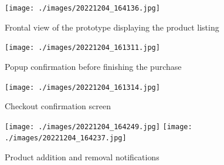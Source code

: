 \documentclass[openright]{normas-utf-tex} %
\begin{document}
\begin{figure}[H]
	\centering
    \texttt{[image: ./images/20221204\_164136.jpg]}
	\caption[]{Frontal view of the prototype displaying the product listing}
\end{figure}

\begin{figure}[H]
	\centering
    \texttt{[image: ./images/20221204\_161311.jpg]}
    \caption[]{Popup confirmation before finishing the purchase}
\end{figure}

\begin{figure}[H]
	\centering
    \texttt{[image: ./images/20221204\_161314.jpg]}
	\caption[]{Checkout confirmation screen}
\end{figure}


\begin{figure}[H]
	\centering
    \texttt{[image: ./images/20221204\_164249.jpg]}
    \texttt{[image: ./images/20221204\_164237.jpg]}
	\caption[]{Product addition and removal notifications}
\end{figure}
\end{document}
